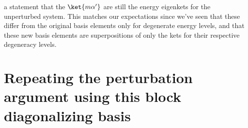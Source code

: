 a statement that the $\ket{m \alpha'}$ are still the energy eigenkets for the unperturbed system.  This matches our expectations since we've seen that these differ from the original basis elements only for degenerate energy levels, and that these new basis elements are superpositions of only the kets for their respective degeneracy levels.

\section{Repeating the perturbation argument using this block diagonalizing basis}

\EndArticle
